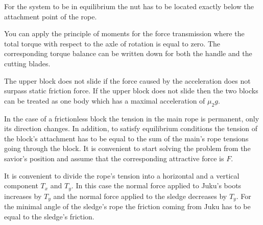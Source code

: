 \documentclass[11pt]{article}
\begin{document}

\hinteng
For the system to be in equilibrium the nut has to be located exactly below the attachment point of the rope.
\probend
\bigskip


\hinteng
You can apply the principle of moments for the force transmission where the total torque with respect to the axle of rotation is equal to zero. The corresponding torque balance can be written down for both the handle and the cutting blades.
\probend
\bigskip


\hinteng
The upper block does not slide if the force caused by the acceleration does not surpass static friction force. If the upper block does not slide then the two blocks can be treated as one body which has a maximal acceleration of $\mu_2g$.
\probend
\bigskip


\hinteng
In the case of a frictionless block the tension in the main rope is permanent, only its direction changes. In addition, to satisfy equilibrium conditions the tension of the block’s attachment has to be equal to the sum of the main’s rope tensions going through the block. It is convenient to start solving the problem from the savior’s position and assume that the corresponding attractive force is $F$.
\probend
\bigskip


\hinteng
It is convenient to divide the rope’s tension into a horizontal and a vertical component $T_x$ and $T_y$. In this case the normal force applied to Juku’s boots increases by $T_y$ and the normal force applied to the sledge decreases by $T_y$. For the minimal angle of the sledge’s rope the friction coming from Juku has to be equal to the sledge’s friction.
\probend
\bigskip

\end{document}
